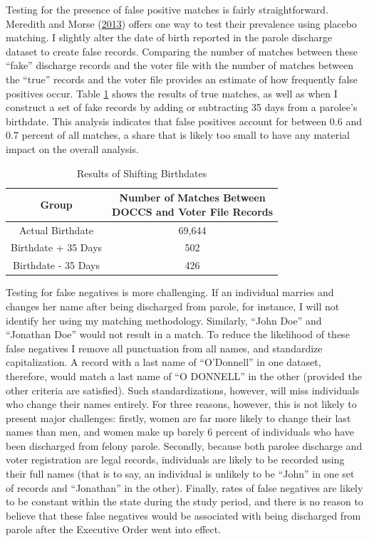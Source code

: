 \documentclass[
  12pt,
]{article}
\begin{document}
Testing for the presence of false positive matches is fairly straightforward. Meredith and Morse (\protect\hyperlink{ref-Meredith2013}{2013}) offers one way to test their prevalence using placebo matching. I slightly alter the date of birth reported in the parole discharge dataset to create false records. Comparing the number of matches between these ``fake'' discharge records and the voter file with the number of matches between the ``true'' records and the voter file provides an estimate of how frequently false positives occur. Table \ref{tab:change-dobs} shows the results of true matches, as well as when I construct a set of fake records by adding or subtracting 35 days from a parolee's birthdate. This analysis indicates that false positives account for between 0.6 and 0.7 percent of all matches, a share that is likely too small to have any material impact on the overall analysis.

\begin{table}[H]

\caption{\label{tab:shift-dobs-chunk}\label{tab:change-dobs} Results of Shifting Birthdates}
\centering
\begin{tabular}[t]{cc}
\toprule
Group & \makecell[l]{Number of Matches Between\\DOCCS and Voter File Records}\\
\midrule
Actual Birthdate & 69,644\\
Birthdate + 35 Days & 502\\
Birthdate - 35 Days & 426\\
\bottomrule
\end{tabular}
\end{table}

Testing for false negatives is more challenging. If an individual marries and changes her name after being discharged from parole, for instance, I will not identify her using my matching methodology. Similarly, ``John Doe'' and ``Jonathan Doe'' would not result in a match. To reduce the likelihood of these false negatives I remove all punctuation from all names, and standardize capitalization. A record with a last name of ``O'Donnell'' in one dataset, therefore, would match a last name of ``O DONNELL'' in the other (provided the other criteria are satisfied). Such standardizations, however, will miss individuals who change their names entirely. For three reasons, however, this is not likely to present major challenges: firstly, women are far more likely to change their last names than men, and women make up barely 6 percent of individuals who have been discharged from felony parole. Secondly, because both parolee discharge and voter registration are legal records, individuals are likely to be recorded using their full names (that is to say, an individual is unlikely to be ``John'' in one set of records and ``Jonathan'' in the other). Finally, rates of false negatives are likely to be constant within the state during the study period, and there is no reason to believe that these false negatives would be associated with being discharged from parole after the Executive Order went into effect.
\end{document}
